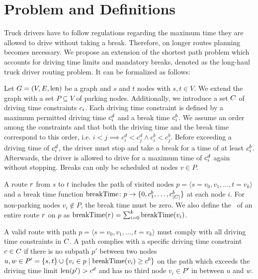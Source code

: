 
\chapter{Problem and Definitions}\label{chapter:problem_definitions}
Truck drivers have to follow regulations regarding the maximum time they are allowed to drive without taking a break. Therefore, on longer routes planning becomes necessary. We propose an extension of the shortest path problem which accounts for driving time limits and mandatory breaks, denoted as the long-haul truck driver routing problem. It can be formalized as follows:

Let $G=(V,E,\operatorname{len})$ be a graph and $s$ and $t$ nodes with $s,t \in V$. We extend the graph with a set $P \subseteq V$ of parking nodes. Additionally, we introduce a set $C$ of driving time constraints $c_i$. Each driving time constraint is defined by a maximum permitted driving time $c_i^d$ and a break time $c_i^b$. We assume an order among the constraints and that both the driving time and the break time correspond to this order, i.e. $i<j \implies c_i^d < c_j^d \wedge c_i^b < c_j^b$. Before exceeding a driving time of $c_i^d$, the driver must stop and take a break for a time of at least $c_i^b$. Afterwards, the driver is allowed to drive for a maximum time of $c_i^d$ again without stopping. Breaks can only be scheduled at nodes $v \in P$.

A route $r$ from $s$ to $t$ includes the path of visited nodes $p = \langle s=v_0,v_1,\dots,t=v_k \rangle$ and a break time function $\operatorname{breakTime}\colon p \rightarrow \{0,c_1^b,\dots,c_{|C|}^b\}$ at each node $i$. For non-parking nodes $v_i \notin P$, the break time must be zero. We also define the \breakTime\ of an entire route $r$ on $p$ as $\operatorname{breakTime}(r) = \sum_{i=0}^{k}{\operatorname{breakTime}(v_i)}$.

\begin{definition}
	A valid route with path $p = \langle s=v_0,v_1,...,t=v_k \rangle$ must comply with all driving time constraints in $C$. A path complies with a specific driving time constraint $c \in C$ if there is no subpath $p'$ between two nodes $u,w \in P' = \{s,t\} \cup \{v_i \in p \mid \operatorname{breakTime}(v_i) \ge c^b\}$ on the path which exceeds the driving time limit $\operatorname{len}(p') > c^d$ and has no third node $v_i \in P'$ in between $u$ and $w$.
\end{definition}

